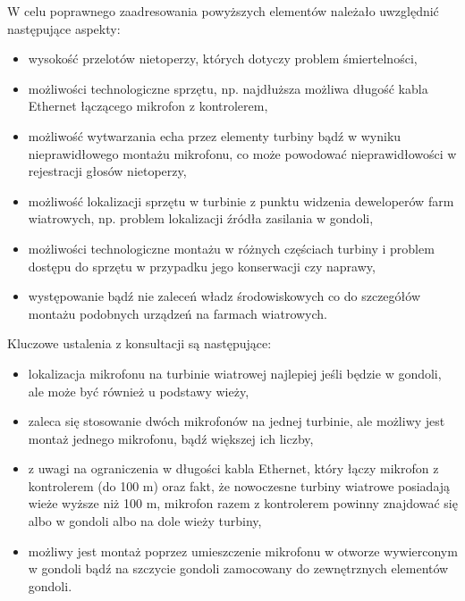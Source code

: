 \documentclass{sprz}
\begin{document}
W celu poprawnego zaadresowania powyższych elementów należało uwzględnić następujące aspekty:

\begin{itemize}
  \item{wysokość przelotów nietoperzy, których dotyczy problem śmiertelności,}
  \item{możliwości technologiczne sprzętu, np. najdłuższa możliwa długość kabla Ethernet łączącego mikrofon z kontrolerem,}
  \item{możliwość wytwarzania echa przez elementy turbiny bądź w wyniku nieprawidłowego montażu mikrofonu, co może powodować nieprawidłowości w rejestracji głosów nietoperzy,}
  \item{możliwość lokalizacji sprzętu w turbinie z punktu widzenia deweloperów farm wiatrowych, np. problem lokalizacji źródła zasilania w gondoli,}
  \item {możliwości technologiczne montażu w różnych częściach turbiny i problem dostępu do sprzętu w przypadku jego konserwacji czy naprawy,}
  \item {występowanie bądź nie zaleceń władz środowiskowych co do szczegółów montażu podobnych urządzeń na farmach wiatrowych.}
\end{itemize}

Kluczowe ustalenia z konsultacji są następujące:
\begin{itemize}
  \item{lokalizacja mikrofonu na turbinie wiatrowej najlepiej jeśli będzie w gondoli, ale może być również u podstawy wieży,}
  \item{zaleca się stosowanie dwóch mikrofonów na jednej turbinie, ale możliwy jest montaż jednego mikrofonu, bądź większej ich liczby,}
  \item{z uwagi na ograniczenia w długości kabla Ethernet, który łączy mikrofon z kontrolerem (do 100 m) oraz fakt, że nowoczesne turbiny wiatrowe posiadają wieże wyższe niż 100 m, mikrofon razem z kontrolerem powinny znajdować się albo w gondoli albo na dole wieży turbiny,}
  \item{możliwy jest montaż poprzez umieszczenie mikrofonu w otworze wywierconym w gondoli bądź na szczycie gondoli zamocowany do zewnętrznych elementów gondoli.}
\end{itemize}
\end{document}
